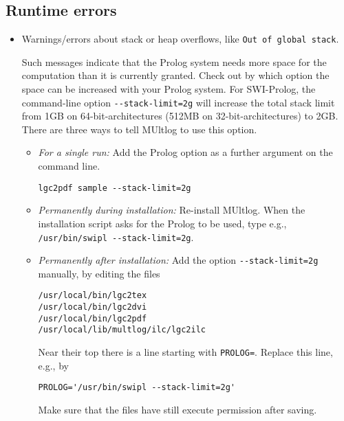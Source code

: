 \documentclass[]{article}
\begin{document}
\hypertarget{runtime-errors}{%
\subsection{Runtime errors}\label{runtime-errors}}

\begin{itemize}
\item
  Warnings/errors about stack or heap overflows, like
  \texttt{Out\ of\ global\ stack}.

  Such messages indicate that the Prolog system needs more space for the
  computation than it is currently granted. Check out by which option
  the space can be increased with your Prolog system. For SWI-Prolog,
  the command-line option \texttt{-\/-stack-limit=2g} will increase the
  total stack limit from 1GB on 64-bit-architectures (512MB on
  32-bit-architectures) to 2GB. There are three ways to tell MUltlog to
  use this option.

  \begin{itemize}
  \item
    \emph{For a single run:} Add the Prolog option as a further argument
    on the command line.

\begin{verbatim}
lgc2pdf sample --stack-limit=2g
\end{verbatim}
  \item
    \emph{Permanently during installation:} Re-install MUltlog. When the
    installation script asks for the Prolog to be used, type e.g.,
    \texttt{/usr/bin/swipl\ -\/-stack-limit=2g}.
  \item
    \emph{Permanently after installation:} Add the option
    \texttt{-\/-stack-limit=2g} manually, by editing the files

\begin{verbatim}
/usr/local/bin/lgc2tex
/usr/local/bin/lgc2dvi
/usr/local/bin/lgc2pdf
/usr/local/lib/multlog/ilc/lgc2ilc
\end{verbatim}

    Near their top there is a line starting with \texttt{PROLOG=}.
    Replace this line, e.g., by

\begin{verbatim}
PROLOG='/usr/bin/swipl --stack-limit=2g'
\end{verbatim}

    Make sure that the files have still execute permission after saving.
  \end{itemize}
\end{itemize}
\end{document}
